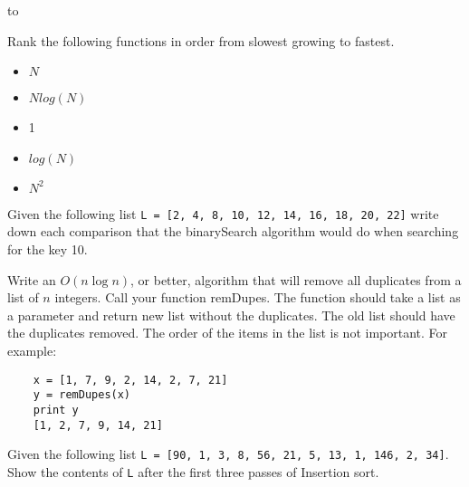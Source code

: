 \documentclass[11pt]{exam}
\begin{document}
\begin{center} 
\end{center} 
\lstset{language=Python,numbers=left}

\vspace{0.1in} 
\hbox to \textwidth{Name:\enspace\hrulefill} 


\begin{questions}

\question[5] Rank the following functions in order from slowest
growing to fastest.
\begin{itemize}
\item $N$
\item $N log(N)$
\item 1
\item $log(N)$
\item $N^2$
\end{itemize}



\question[10] Given the following list \lstinline{L = [2, 4, 8, 10, 12, 14, 16, 18, 20, 22]} write down each comparison that the binarySearch algorithm would do when searching for the key 10.
\vspace{3in}


\newpage
\question[10] 
Write an $O(n \log{n})$, or better, algorithm that will remove all duplicates from a list of $n$ integers.  Call your function remDupes.  The function should take a list as a parameter and return new list without the duplicates.  The old list should have the duplicates removed.  The order of the items in the list is not important.  For example:
\begin{verbatim}
    x = [1, 7, 9, 2, 14, 2, 7, 21]
    y = remDupes(x)
    print y
    [1, 2, 7, 9, 14, 21]
\end{verbatim}
\vspace{4.5in}



\newpage
\question[10] Given the following list \lstinline{L = [90, 1, 3, 8, 56, 21, 5, 13, 1, 146, 2, 34]}.  Show the contents of \lstinline{L} after the first three passes of Insertion sort.
\vspace{4.5in}




\end{questions}
\end{document}
